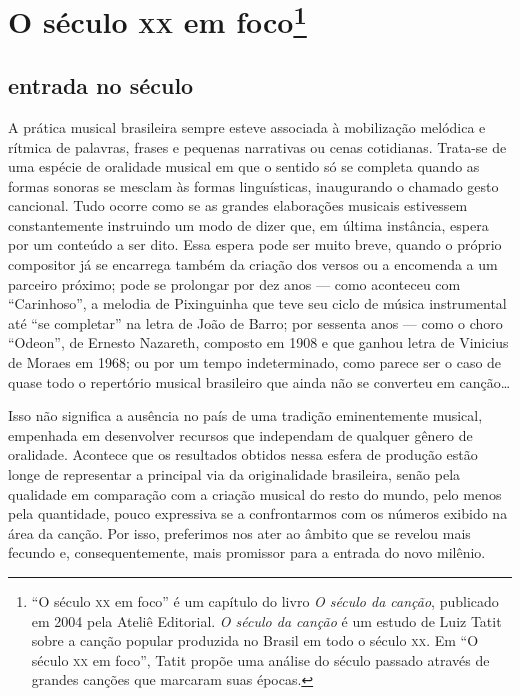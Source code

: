 \chapter{O século \textsc{xx} em foco\footnote{``O século \textsc{xx} em foco'' é um capítulo do livro \textit{O século da canção}, publicado em 2004 pela Ateliê Editorial. \textit{O século da canção} é um estudo de Luiz Tatit sobre a canção popular produzida no Brasil em todo o século \textsc{xx}. Em ``O século \textsc{xx} em foco'', Tatit propõe uma análise do século passado através de grandes canções que marcaram suas épocas.}}

\section{entrada no século}

A prática musical brasileira sempre esteve associada à mobilização
melódica e rítmica de palavras, frases e pequenas narrativas ou cenas
cotidianas. Trata-se de uma espécie de oralidade musical em que o
sentido só se completa quando as formas sonoras se mesclam às formas
linguísticas, inaugurando o chamado gesto cancional. Tudo ocorre como se
as grandes elaborações musicais estivessem constantemente instruindo um
modo de dizer que, em última instância, espera por um conteúdo a ser
dito. Essa espera pode ser muito breve, quando o próprio compositor já
se encarrega também da criação dos versos ou a encomenda a um parceiro
próximo; pode se prolongar por dez anos --- como aconteceu com
``Carinhoso'', a melodia de Pixinguinha que teve seu ciclo de música
instrumental até ``se completar'' na letra de João de Barro; por
sessenta anos --- como o choro ``Odeon'', de Ernesto Nazareth, composto
em 1908 e que ganhou letra de Vinicius de Moraes em 1968; ou por um
tempo indeterminado, como parece ser o caso de quase todo o repertório
musical brasileiro que ainda não se converteu em canção\ldots

Isso não significa a ausência no país de uma tradição eminentemente
musical, empenhada em desenvolver recursos que independam de qualquer
gênero de oralidade. Acontece que os resultados obtidos nessa esfera de
produção estão longe de representar a principal via da originalidade
brasileira, senão pela qualidade em comparação com a criação musical do
resto do mundo, pelo menos pela quantidade, pouco expressiva se a
confrontarmos com os números exibido na área da canção. Por isso,
preferimos nos ater ao âmbito que se revelou mais fecundo e,
consequentemente, mais promissor para a entrada do novo milênio.

